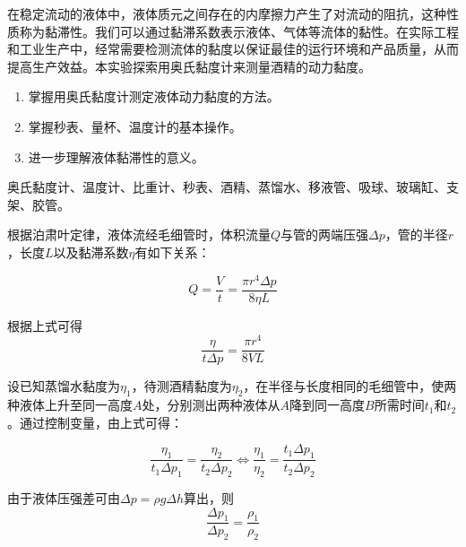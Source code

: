\documentclass[UTF-8, a4paper, 12pt]{ctexart}
\begin{document}
    \begin{center}

    \end{center}
    \songti
    在稳定流动的液体中，液体质元之间存在的内摩擦力产生了对流动的阻抗，这种性质称为黏滞性。我们可以通过黏滞系数表示液体、气体等流体的黏性。在实际工程和工业生产中，经常需要检测流体的黏度以保证最佳的运行环境和产品质量，从而提高生产效益。本实验探索用奥氏黏度计来测量酒精的动力黏度。

    \textbf{ }

    \songti

    \begin{enumerate}[（1）]
        \item 掌握用奥氏黏度计测定液体动力黏度的方法。
        \item 掌握秒表、量杯、温度计的基本操作。
        \item 进一步理解液体黏滞性的意义。
    \end{enumerate}

    \textbf{ }

    \songti

    奥氏黏度计、温度计、比重计、秒表、酒精、蒸馏水、移液管、吸球、玻璃缸、支架、胶管。

    \textbf{ }

    \songti

    根据泊肃叶定律，液体流经毛细管时，体积流量$Q$与管的两端压强$\Delta p$，管的半径$r$，长度$L$以及黏滞系数$\eta$有如下关系：

    $$Q = \frac{V}{t} = \frac{\pi r^4 \Delta p}{8\eta L}$$

    根据上式可得$$\frac{\eta}{t\Delta p} = \frac{\pi r^4}{8VL}$$
    
    设已知蒸馏水黏度为$\eta_1$，待测酒精黏度为$\eta_2$，在半径与长度相同的毛细管中，使两种液体上升至同一高度$A$处，分别测出两种液体从$A$降到同一高度$B$所需时间$t_1$和$t_2$。通过控制变量，由上式可得：

    $$\frac{\eta_1}{t_1\Delta p_1} = \frac{\eta_2}{t_2\Delta p_2} \iff \frac{\eta_1}{\eta_2} = \frac{t_1\Delta p_1}{t_2 \Delta p_2}$$

    由于液体压强差可由$\Delta p=\rho g \Delta h$算出，则$$\frac{\Delta p_1}{\Delta p_2} = \frac{\rho_1}{\rho_2}$$
\end{document}
